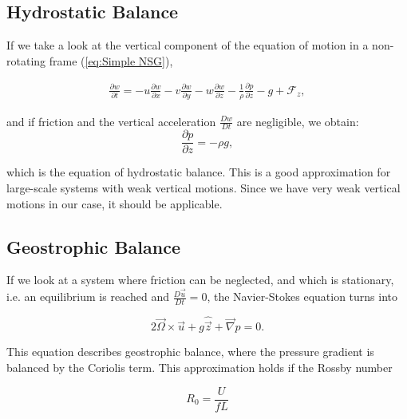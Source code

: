 \documentclass[12pt, a4paper]{article} %
\begin{document}
		
	\subsection{Hydrostatic Balance}
		If we take a look at the vertical component of the equation of motion in a non-rotating frame (\ref{eq:Simple NSG}),
		
		\begin{eqnarray}
		\frac{\partial w}{\partial t} = - u \frac{\partial w}{\partial x} - v \frac{\partial w}{\partial y} - w \frac{\partial w}{\partial z} - \frac{1}{\rho} \frac{\partial p}{\partial z} - g + \mathcal{F}_z ,
		\label{eq:Simple NSG z}
		\end{eqnarray}
		
		and if friction and the vertical acceleration $\frac{Dw}{Dt}$ are negligible, we obtain:
		\begin{equation}
		\frac{\partial p}{\partial z} = -\rho g ,
		\label{eq:Hydrostat Balance}
		\end{equation}
	
		which is the equation of hydrostatic balance. This is a good approximation for large-scale systems with weak vertical motions. Since we have very weak vertical motions in our case, it should be applicable.
		
	\subsection{Geostrophic Balance} %
		If we look at a system where friction can be neglected, and which is stationary, i.e. an equilibrium is reached and $\frac{D\vec{u}}{Dt}=0$, the Navier-Stokes equation turns into
		
		\begin{equation}
			2\vec{\Omega} \times \vec{u} +  g\hat{\vec{z}} + \vec{\nabla} p = 0 .
			\label{eq:Geostrophic Balance}
		\end{equation}
		
		This equation describes geostrophic balance, where the pressure gradient is balanced by the Coriolis term. This approximation holds if the Rossby number 
		
		\begin{equation}
			R_0 = \frac{U}{f L}
			\label{eq:Rossby Number}
		\end{equation}
		
\end{document}
